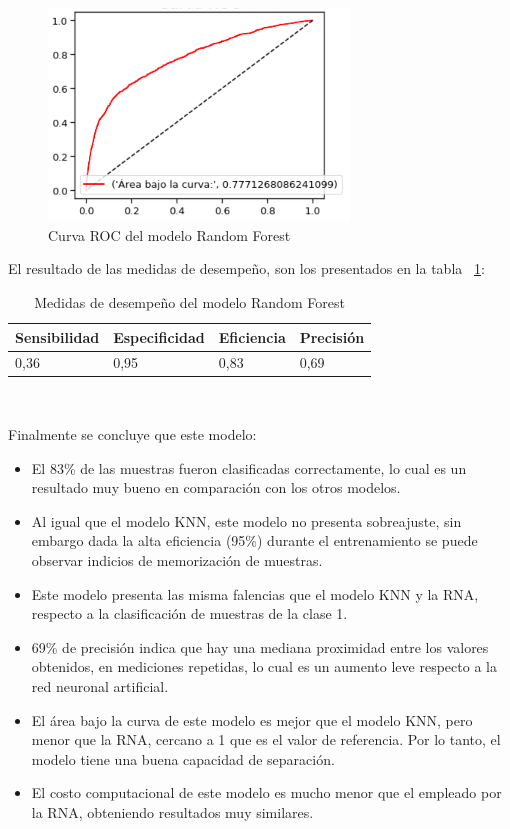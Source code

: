 \documentclass[conference]{IEEEtran}
\begin{document}
\begin{center}
    \begin{figure}[H]
        \hfill
     \centerline{\includegraphics[width=8cm]{ROCRDF.png}}
    \caption{Curva ROC del modelo Random Forest }
    \label{fig:rocRDF}
    \end{figure}  
\end{center}

El resultado de las medidas de desempeño, son los presentados en la tabla ~\ref{tab:medidasRDF}:
\newline
\begin{table}[H]
\centering
\begin{tabular}{|l|l|l|l|}
\hline
Sensibilidad & Especificidad & \multicolumn{1}{r|}{Eficiencia} & Precisión \\ \hline
0,36         & 0,95          & 0,83                            & 0,69      \\ \hline
\end{tabular}\hfill\\
\caption{Medidas de desempeño del modelo Random Forest}
\label{tab:medidasRDF}
\end{table}
Finalmente se concluye que este modelo:
\begin{itemize}
\item El 83\% de las muestras fueron clasificadas correctamente, lo cual es un resultado muy bueno en comparación con los otros modelos.
\item Al igual que el modelo KNN, este modelo no presenta sobreajuste, sin embargo dada la alta eficiencia (95\%) durante el entrenamiento se puede observar indicios de memorización de muestras.
\item Este modelo presenta las misma falencias que el modelo KNN y la RNA, respecto a la clasificación de muestras de la clase 1.
\item 69\% de precisión indica que hay una mediana proximidad entre los valores obtenidos, en mediciones repetidas, lo cual es un aumento leve respecto a la red neuronal artificial.
\item El área bajo la curva de este modelo es mejor que el modelo KNN, pero menor que la RNA, cercano a 1 que es el valor de referencia. Por lo tanto, el modelo  tiene una buena capacidad de separación.
\item El costo computacional de este modelo es mucho menor que el empleado por la RNA, obteniendo resultados muy similares.
\end{itemize}
\end{document}
